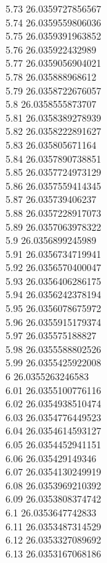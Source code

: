{5.73	26.0359727856567\\
5.74	26.0359559806036\\
5.75	26.0359391963852\\
5.76	26.035922432989\\
5.77	26.0359056904021\\
5.78	26.035888968612\\
5.79	26.0358722676057\\
5.8	26.0358555873707\\
5.81	26.0358389278939\\
5.82	26.0358222891627\\
5.83	26.035805671164\\
5.84	26.0357890738851\\
5.85	26.0357724973129\\
5.86	26.0357559414345\\
5.87	26.035739406237\\
5.88	26.0357228917073\\
5.89	26.0357063978322\\
5.9	26.0356899245989\\
5.91	26.0356734719941\\
5.92	26.0356570400047\\
5.93	26.0356406286175\\
5.94	26.0356242378194\\
5.95	26.0356078675972\\
5.96	26.0355915179374\\
5.97	26.035575188827\\
5.98	26.0355588802526\\
5.99	26.0355425922008\\
6	26.0355263246583\\
6.01	26.0355100776116\\
6.02	26.0354938510474\\
6.03	26.0354776449523\\
6.04	26.0354614593127\\
6.05	26.0354452941151\\
6.06	26.035429149346\\
6.07	26.0354130249919\\
6.08	26.0353969210392\\
6.09	26.0353808374742\\
6.1	26.0353647742833\\
6.11	26.0353487314529\\
6.12	26.0353327089692\\
6.13	26.0353167068186\\
}
